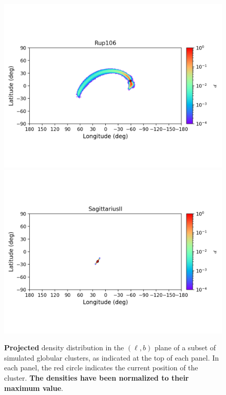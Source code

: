 \begin{figure}
        \includegraphics[clip=true, trim = 0mm 20mm 0mm 10mm, width=1\columnwidth]{images/error_plots_Rup106.png}
        \includegraphics[clip=true, trim = 0mm 20mm 0mm 10mm, width=1\columnwidth]{images/error_plots_SagittariusII.png}
        \caption[]{\textbf{Projected} density distribution in the $(\ell, b)$ plane of a subset of simulated globular clusters, as indicated at the top of each panel. In each panel, the red circle indicates the current position of the cluster. \textbf{The densities have been normalized to their maximum value}.}\label{stream18}
        \end{figure}
